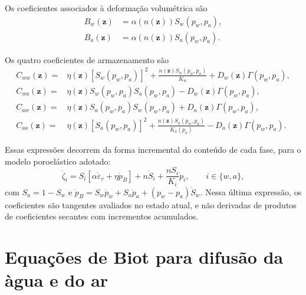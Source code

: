 \documentclass[11pt,a4paper]{article}
\begin{document}
Os coeficientes associados \`a deforma\c{c}\~ao volum\'etrica s\~ao
\begin{equation*}
\boxed{\begin{aligned}
B_w(\mathbf z)&=\alpha(n(\mathbf z))S_w(p_w,p_a),\\
B_a(\mathbf z)&=\alpha(n(\mathbf z))S_a(p_w,p_a).
\end{aligned}}
\end{equation*}

Os quatro coeficientes de armazenamento s\~ao
\begin{equation*}
\boxed{\begin{aligned}
C_{ww}(\mathbf z)={}&\eta(\mathbf z)[S_w(p_w,p_a)]^2
+\frac{n(\mathbf z)S_w(p_w,p_a)}{K_w}
+D_w(\mathbf z)\Gamma(p_w,p_a),\\
C_{wa}(\mathbf z)={}&\eta(\mathbf z)S_w(p_w,p_a)S_a(p_w,p_a)
-D_w(\mathbf z)\Gamma(p_w,p_a),\\
C_{aw}(\mathbf z)={}&\eta(\mathbf z)S_a(p_w,p_a)S_w(p_w,p_a)
+D_a(\mathbf z)\Gamma(p_w,p_a),\\
C_{aa}(\mathbf z)={}&\eta(\mathbf z)[S_a(p_w,p_a)]^2
+\frac{n(\mathbf z)S_a(p_w,p_a)}{K_a(p_a)}
-D_a(\mathbf z)\Gamma(p_w,p_a).
\end{aligned}}
\end{equation*}

Essas express\~oes decorrem da forma incremental do conte\'udo de cada
fase, para o modelo poroel\'astico adotado:
\begin{equation*}
\dot\zeta_i=S_i\left[\alpha\dot\varepsilon_v+\eta\dot p_B\right]
+n\dot S_i+\frac{nS_i}{K_i}\dot p_i,
\qquad i\in\{w,a\},
\end{equation*}
com $S_a=1-S_w$ e $\dot p_B=S_w\dot p_w+S_a\dot p_a
+(p_w-p_a)\dot S_w$. Nessa \'ultima express\~ao, os coeficientes
s\~ao tangentes avaliados no estado atual, e n\~ao derivadas de produtos
de coeficientes secantes com incrementos acumulados.

\section{Equa\c{c}\~oes de Biot para difus\~ao da \`agua e do ar}
\end{document}
